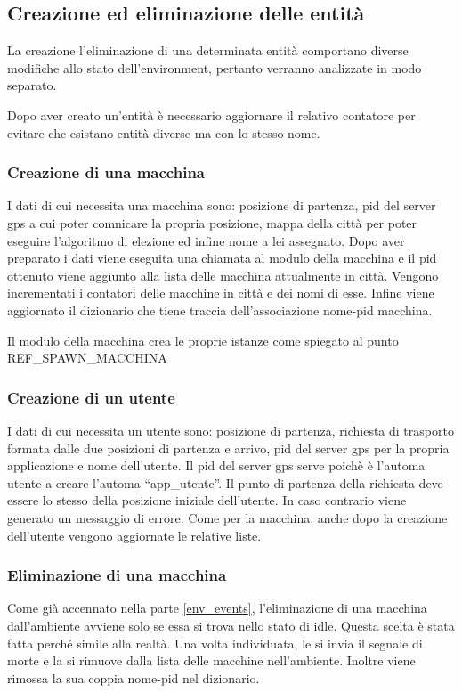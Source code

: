 \subsection{Creazione ed eliminazione delle entità} \label{creazione_distruzione_entita}
La creazione l'eliminazione di una determinata entità comportano diverse modifiche allo stato dell'environment, pertanto verranno analizzate in modo separato.

Dopo aver creato un'entità è necessario aggiornare il relativo contatore per evitare che esistano entità diverse ma con lo stesso nome.

\subsubsection{Creazione di una macchina}
I dati di cui necessita una macchina sono: posizione di partenza, pid del server gps a cui poter comnicare la propria posizione, mappa della città per poter eseguire l'algoritmo di elezione ed infine nome a lei assegnato. Dopo aver preparato i dati viene eseguita una chiamata al modulo della macchina e il pid ottenuto viene aggiunto alla lista delle macchina attualmente in città. Vengono incrementati i contatori delle macchine in città e dei nomi di esse. Infine viene aggiornato il dizionario che tiene traccia dell'associazione nome-pid macchina.

Il modulo della macchina crea le proprie istanze come spiegato al punto REF\_SPAWN\_MACCHINA

\subsubsection{Creazione di un utente}
I dati di cui necessita un utente sono: posizione di partenza, richiesta di trasporto formata dalle due posizioni di partenza e arrivo, pid del server gps per la propria applicazione e nome dell'utente. Il pid del server gps serve poichè è l'automa utente a creare l'automa ``app\_utente''. Il punto di partenza della richiesta deve essere lo stesso della posizione iniziale dell'utente. In caso contrario viene generato un messaggio di errore. Come per la macchina, anche dopo la creazione dell'utente vengono aggiornate le relative liste.

\subsubsection{Eliminazione di una macchina}
Come già accennato nella parte \ref{env_events}, l'eliminazione di una macchina dall'ambiente avviene solo se essa si trova nello stato di idle. Questa scelta è stata fatta perché simile alla realtà. Una volta individuata, le si invia il segnale di morte e la si rimuove dalla lista delle macchine nell'ambiente. Inoltre viene rimossa la sua coppia nome-pid nel dizionario.

